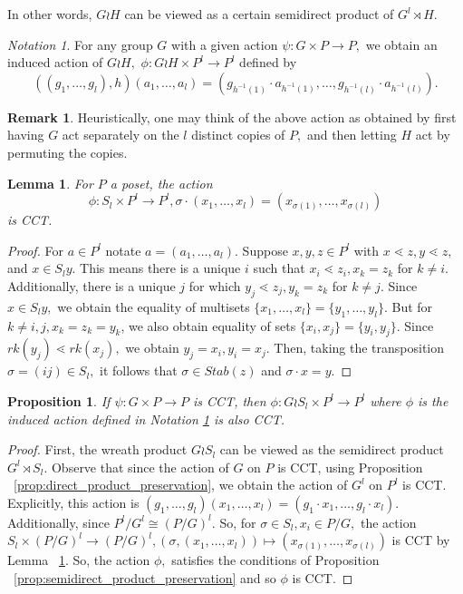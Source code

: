 \documentclass[10 pt]{amsart}
\theoremstyle{plain}
\newtheorem{prop}[thm]{Proposition}
\newtheorem{lem}[thm]{Lemma}
\theoremstyle{definition}
\newtheorem{rem}[thm]{Remark}
\theoremstyle{remark}
\newtheorem{note}[thm]{Notation}
\numberwithin{equation}{section}
\begin{document}
In other words, $G\wr H$ can be viewed as a certain semidirect product of $G^l \rtimes H.$

\begin{note}
\label{note:wreath_action}
For any group $G$ with a given action $\psi:G\times P \rightarrow P,$ we obtain an induced action of $G \wr H,$ $\phi:G \wr H \times P^l \rightarrow P^l$ defined by 
$$((g_1,\ldots, g_l),h)(a_1,\ldots, a_l) = (g_{h^{-1}(1)}\cdot a_{h^{-1}(1)},\ldots,g_{h^{-1}(l)} \cdot a_{h^{-1}(l)}).$$
\end{note}

\begin{rem}
Heuristically, one may think of the above action as obtained by first having $G$ act separately on the $l$ distinct copies of $P,$ and then letting $H$ act by permuting the copies.
\end{rem}

\begin{lem}
\label{lem:symmetric_group_product_action}
For $P$ a poset, the action 
$$\phi:S_l \times P^l \rightarrow P^l,\sigma \cdot(x_1,\ldots, x_l) = (x_{\sigma(1)},\ldots, x_{\sigma(l)})$$
is CCT.
\end{lem}
\begin{proof}
For $a \in P^l$ notate $a = (a_1,\ldots, a_l).$ Suppose $x,y,z \in P^l$ with $x\lessdot z,y\lessdot z,$ and $x \in S_ly.$ This means there is a unique $i$ such that $x_i \lessdot z_i,x_k = z_k$ for $k \neq i.$ Additionally, there is a unique $j$ for which $y_j \lessdot z_j,y_k =z_k$ for $k \neq j.$ Since $x \in S_ly,$ we obtain the equality of multisets $\{x_1,\ldots, x_l\}=\{y_1,\ldots,y_l\}.$ But for $k \neq i,j,x_k = z_k = y_k$, we also obtain equality of sets $\{x_i,x_j\} = \{y_i,y_j\}.$ Since $rk(y_j) \lessdot rk(x_j),$ we obtain $y_j = x_i,y_i = x_j.$ Then, taking the transposition $\sigma  = (ij) \in S_l,$ it follows that $\sigma \in Stab(z)$ and $\sigma \cdot x = y.$
\end{proof}

\begin{prop}
\label{prop:wreath_preservation}
If $\psi:G\times P \rightarrow P$ is CCT, then $\phi:G\wr S_l \times P^l \rightarrow P^l$ where $\phi$ is the induced action defined in Notation \ref{note:wreath_action} is also CCT.
\end{prop}
\begin{proof}
First, the wreath product $G \wr S_l$ can be viewed as the semidirect product $G^l \rtimes S_l.$ Observe that since the action of $G$ on $P$ is CCT, using Proposition ~\ref{prop:direct_product_preservation}, we obtain the action of $G^l$ on $P^l$ is CCT. Explicitly, this action is $(g_1,\ldots, g_l)(x_1,\ldots, x_l) = (g_1 \cdot x_1,\ldots, g_l \cdot x_l).$ Additionally, since $P^l/G^l \cong (P/G)^l.$ So, for $\sigma \in S_l,x_i \in P/G,$ the action $S_l \times (P/G)^l \rightarrow (P/G)^l,(\sigma ,(x_1,\ldots, x_l)) \mapsto (x_{\sigma(1)},\ldots, x_{\sigma(l)})$ is CCT by Lemma ~\ref{lem:symmetric_group_product_action}. So, the action $\phi,$ satisfies the conditions of Proposition ~\ref{prop:semidirect_product_preservation} and so $\phi$ is CCT.
\end{proof}
\end{document}
